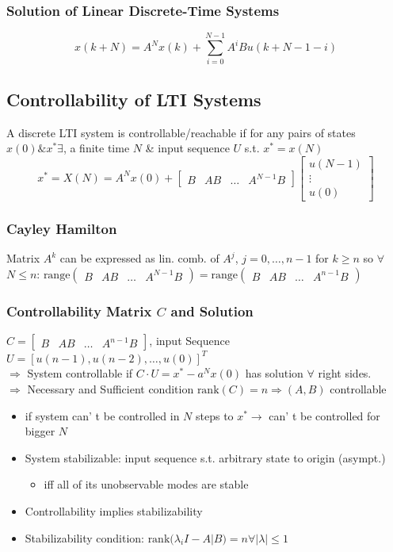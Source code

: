 \subsubsection{Solution of Linear Discrete-Time Systems} \[x(k+N) = A^Nx(k) + \sum^{N-1}_{i=0} A^iBu(k+N-1-i) \]
\subsection{Controllability of LTI Systems}
A discrete LTI system is controllable/reachable if for any pairs of states $x(0) \& x^* \exists$, a finite time $N$ \& input sequence $U$ s.t. $x^*=x(N)$
\[x^* = X(N) = A^Nx(0) + \begin{bmatrix} B & AB & \dotsc& A^{N-1}B\end{bmatrix}\begin{bmatrix}
    u(N-1) \\ \vdots\\u(0)
\end{bmatrix}\]
\subsubsection{Cayley Hamilton}
Matrix $A^k$ can be expressed as lin. comb. of $A^j$, $j=0, \dotsc, n-1$ for $k \geq n$ so $\forall$ $N\leq n$: $\textrm{range}\begin{pmatrix}  B & AB & \dotsc & A^{N-1}B
\end{pmatrix}= \textrm{range}\begin{pmatrix}  B & AB & \dotsc & A^{n-1}B
\end{pmatrix}$
\subsubsection{Controllability Matrix $C$ and Solution}
$C = \begin{bmatrix}
    B & AB & \dotsc & A^{n-1}B
\end{bmatrix}$, input Sequence $ U= [u(n-1), u(n-2), \dotsc, u(0)]^T$\\
$\Rightarrow$ System controllable if $C\cdot U = x^*-a^Nx(0)$ has solution $\forall$ right sides. \\
$\Rightarrow$ Necessary and Sufficient condition $\textrm{rank}(C)=n\Rightarrow (A,B)$ controllable 
\begin{itemize}
    \item if system can' t be controlled in $N$ steps to $x^* \rightarrow$ can' t be controlled  for bigger $N$
    \item System stabilizable: input sequence s.t. arbitrary state to origin (asympt.)
    \begin{itemize}
        \item iff all of its unobservable modes are stable 
    \end{itemize}
    \item Controllability implies stabilizability
    \item Stabilizability condition: $\textrm{rank}(\lambda_iI-A|B) = n\forall |\lambda| \leq 1$
\end{itemize}
